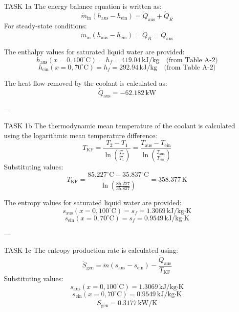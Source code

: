 TASK 1a  
The energy balance equation is written as:  
\[
\dot{m}_{\text{in}} (h_{\text{aus}} - h_{\text{ein}}) = \dot{Q}_{\text{aus}} + \dot{Q}_R
\]  
For steady-state conditions:  
\[
\dot{m}_{\text{in}} (h_{\text{aus}} - h_{\text{ein}}) = \dot{Q}_R = \dot{Q}_{\text{aus}}
\]  

The enthalpy values for saturated liquid water are provided:  
\[
h_{\text{aus}} (x = 0, 100^\circ\text{C}) = h_f = 419.04 \, \text{kJ/kg} \quad \text{(from Table A-2)}
\]  
\[
h_{\text{ein}} (x = 0, 70^\circ\text{C}) = h_f = 292.94 \, \text{kJ/kg} \quad \text{(from Table A-2)}
\]  

The heat flow removed by the coolant is calculated as:  
\[
\dot{Q}_{\text{aus}} = -62.182 \, \text{kW}
\]  

---

TASK 1b  
The thermodynamic mean temperature of the coolant is calculated using the logarithmic mean temperature difference:  
\[
T_{\text{KF}} = \frac{T_2 - T_1}{\ln\left(\frac{T_2}{T_1}\right)} = \frac{T_{\text{aus}} - T_{\text{ein}}}{\ln\left(\frac{T_{\text{aus}}}{T_{\text{ein}}}\right)}
\]  
Substituting values:  
\[
T_{\text{KF}} = \frac{85.227^\circ\text{C} - 35.837^\circ\text{C}}{\ln\left(\frac{85.227}{35.837}\right)} = 358.377 \, \text{K}
\]  

The entropy values for saturated liquid water are provided:  
\[
s_{\text{aus}} (x = 0, 100^\circ\text{C}) = s_f = 1.3069 \, \text{kJ/kg·K}
\]  
\[
s_{\text{ein}} (x = 0, 70^\circ\text{C}) = s_f = 0.9549 \, \text{kJ/kg·K}
\]  

---

TASK 1c  
The entropy production rate is calculated using:  
\[
\dot{S}_{\text{gen}} = \dot{m} (s_{\text{aus}} - s_{\text{ein}}) - \frac{\dot{Q}_{\text{aus}}}{T_{\text{KF}}}
\]  
Substituting values:  
\[
s_{\text{aus}} (x = 0, 100^\circ\text{C}) = 1.3069 \, \text{kJ/kg·K}
\]  
\[
s_{\text{ein}} (x = 0, 70^\circ\text{C}) = 0.9549 \, \text{kJ/kg·K}
\]  
\[
\dot{S}_{\text{gen}} = 0.3177 \, \text{kW/K}
\]